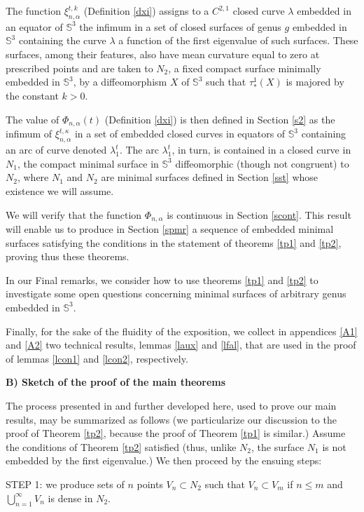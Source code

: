 \documentclass{article}
\def\S3{{\mathbb S^3}}
\begin{document}
The function $\xi_{n,\alpha}^{t,k}$ (Definition \ref{dxi}) assigns to a $C^{2,1}$ closed  curve $\lambda$ embedded in an equator of $\S3$ the infimum in a set   of closed surfaces of genus $g$ embedded in $\S3$ containing the curve $\lambda$ a function of  the first eigenvalue  of such surfaces. These surfaces, among their features, also have mean curvature equal to zero at prescribed  points and are taken to $N_2$, a fixed compact surface minimally embedded in $\S3$, by a diffeomorphism $X$ of $\S3$ such that $\tau_*^1(X)$ is majored by the constant $k>0$. 

The value of $\Phi_{n,\alpha}(t)$ (Definition \ref{dxi}) is then defined in Section \ref{s2} as the infimum of $\xi_{n,\alpha}^{t,\kappa}$ in a set of embedded closed curves in equators of $\S3$ containing an arc of curve denoted $\lambda_1^t$. The arc $\lambda_1^t$, in turn, is contained in a closed curve in $N_1$, the  compact minimal surface in $\S3$ diffeomorphic (though not congruent) to $N_2$, where $N_1$ and $N_2$ are minimal surfaces defined in Section \ref{sst} whose existence we will assume. 


We will verify that the function $\Phi_{n,\alpha}$ is continuous in Section \ref{scont}. This result will enable us to produce in Section \ref{spmr} a sequence of embedded minimal surfaces satisfying the conditions in the statement of theorems \ref{tp1} and \ref{tp2}, proving thus these theorems.

In our Final remarks, we consider how to use theorems \ref{tp1} and \ref{tp2} to investigate some open questions concerning minimal surfaces of arbitrary genus embedded in $\S3$.

Finally, for the sake of the fluidity of the exposition, we collect in appendices \ref{A1} and \ref{A2} two technical results, lemmas \ref{laux} and \ref{lfal}, that are used in the proof of lemmas \ref{lcon1} and 
\ref{lcon2}, respectively.\bigskip

\noindent
{\bf B) Sketch of the proof of the main theorems}\bigskip

The process presented in \cite{p1} and further developed here, used to prove our main results,  may be summarized as follows (we particularize our discussion to the proof of Theorem \ref{tp2}, because the proof of Theorem \ref{tp1} is similar.) Assume the conditions of Theorem \ref{tp2} satisfied (thus, unlike $N_2$, the surface $N_1$ is not embedded by the first eigenvalue.) We then proceed by the ensuing steps: \bigskip

\noindent
\hspace{.05in}STEP 1: we produce sets of  $n$ points $V_n\subset N_2$ such that $V_n\subset V_m$ if $n\leq m$ and $\bigcup_{n=1}^\infty V_n$ is dense  in $N_2$.\medskip
\end{document}
